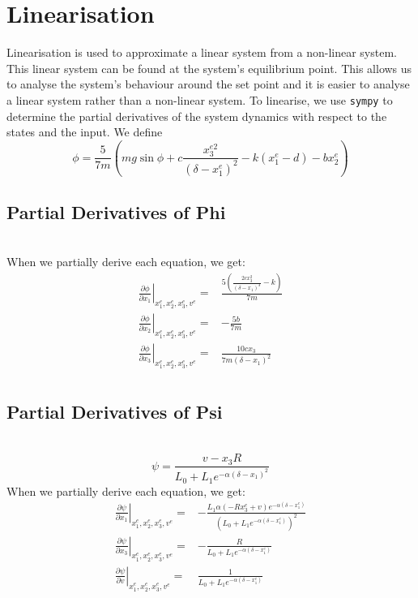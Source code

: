 
\section{Linearisation} 
Linearisation is used to approximate a linear system from a non-linear system. This linear system can be
found at the system’s equilibrium point. This allows us to analyse the system’s behaviour around the set point
and it is easier to analyse a linear system rather than a non-linear system.
To linearise, we use \texttt{sympy} to determine the partial derivatives of the system dynamics with respect to the states and the input. We define
\begin{equation}
    \phi = \frac{5}{7m}  \left(mg\sin{\phi} + c\frac{x_3^{e2}}{(\delta - x_1^{e})^2} -k(x_1^{e}-d) -bx_2^{e}   \right)
\end{equation}
\subsection*{Partial Derivatives of Phi}
\hfill \\
When we partially derive each equation, we get:
\begin{align}
\left.\frac{\partial \phi}{\partial x_1}\right|_{x_1^e, x_2^e, x_3^e,v^e} ={}& \frac{5 \left(\frac{2 c x_{3}^{2}}{\left(\delta - x_{1}\right)^{3}} - k\right)}{7 m}
\\
\left.\frac{\partial \phi}{\partial x_2}\right|_{x_1^e, x_2^e, x_3^e,v^e} ={}&  - \frac{5 b}{7 m}
\\
\left.\frac{\partial \phi}{\partial x_3}\right|_{x_1^e, x_2^e, x_3^e,v^e} ={}&  \frac{10 c x_{3}}{7 m \left(\delta - x_{1}\right)^{2}}
\\
\end{align}
\subsection*{Partial Derivatives of Psi} \hfill \\
\begin{equation}
    \psi = \frac{v - x_3R}{L_0 + L_1e^{-\alpha (\delta - x_1)^2}}
\end{equation}
When we partially derive each equation, we get:
\begin{align}
\left.\frac{\partial \psi}{\partial x_1}\right|_{x_1^e, x_2^e, x_3^e,v^e} ={}& - \frac{L_{1} \alpha \left(- R x_{3}^e + v\right) e^{- \alpha \left(\delta - x_{1}^e\right)}}{\left(L_{0} + L_{1} e^{- \alpha \left(\delta - x_{1}^e\right)}\right)^{2}}
\\
\left.\frac{\partial \psi}{\partial x_3}\right|_{x_1^e, x_2^e, x_3^e,v^e} ={}& - \frac{R}{L_{0} + L_{1} e^{- \alpha \left(\delta - x_{1}^e\right)}}
\\
\left.\frac{\partial \psi}{\partial v}\right|_{x_1^e, x_2^e, x_3^e,v^e} ={}& \frac{1}{L_{0} + L_{1} e^{- \alpha \left(\delta - x_{1}^e\right)}}
\\
\end{align}
